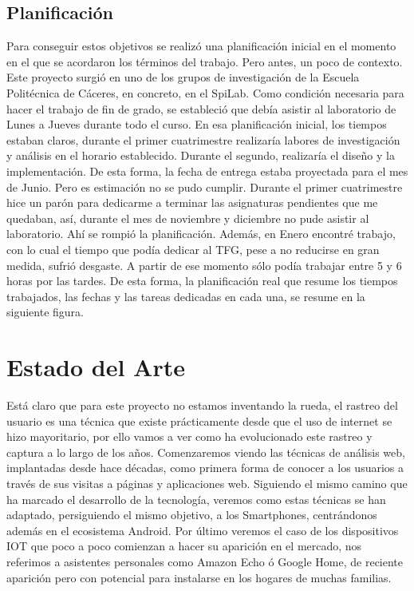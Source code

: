 \documentclass[12pt,a4paper,oneside]{book} %
\begin{document}
\section{Planificación}
Para conseguir estos objetivos se realizó una planificación inicial en el momento en el que se acordaron los términos del trabajo. Pero antes, un poco de contexto. 
\newline \newline 
Este proyecto surgió en uno de los grupos de investigación de la Escuela Politécnica de Cáceres, en concreto, en el SpiLab. Como condición necesaria para hacer el trabajo de fin de grado, se estableció que debía asistir al laboratorio de Lunes a Jueves durante todo el curso. En esa planificación inicial, los tiempos estaban claros, durante el primer cuatrimestre realizaría labores de investigación y análisis en el horario establecido. Durante el segundo, realizaría el diseño y la implementación. De esta forma, la fecha de entrega estaba proyectada para el mes de Junio. 
\newline \newline
Pero es estimación no se pudo cumplir. Durante el primer cuatrimestre hice un parón para dedicarme a terminar las asignaturas pendientes que me quedaban, así, durante el mes de noviembre y diciembre no pude asistir al laboratorio. Ahí se rompió la planificación. Además, en Enero encontré trabajo, con lo cual el tiempo que podía dedicar al TFG, pese a no reducirse en gran medida, sufrió desgaste. A partir de ese momento sólo podía trabajar entre 5 y 6 horas por las tardes. 
\newline \newline 
De esta forma, la planificación real que resume los tiempos trabajados, las fechas y las tareas dedicadas en cada una, se resume en la siguiente figura. 

\chapter{Estado del Arte}
Está claro que para este proyecto no estamos inventando la rueda, el rastreo del usuario es una técnica que existe prácticamente desde que el uso de internet se hizo mayoritario, por ello vamos a ver como ha evolucionado este rastreo y captura a lo largo de los años. 
\newline \newline 
Comenzaremos viendo las técnicas de análisis web, implantadas desde hace décadas, como primera forma de conocer a los usuarios a través de sus visitas a páginas y aplicaciones web. 
\newline \newline
Siguiendo el mismo camino que ha marcado el desarrollo de la tecnología, veremos como estas técnicas se han adaptado, persiguiendo el mismo objetivo, a los Smartphones, centrándonos además en el ecosistema Android. 
\newline \newline 
Por último veremos el caso de los dispositivos IOT que poco a poco comienzan a hacer su aparición en el mercado, nos referimos a asistentes personales como Amazon Echo ó Google Home, de reciente aparición pero con potencial para instalarse en los hogares de muchas familias.
\newpage 
\end{document}
